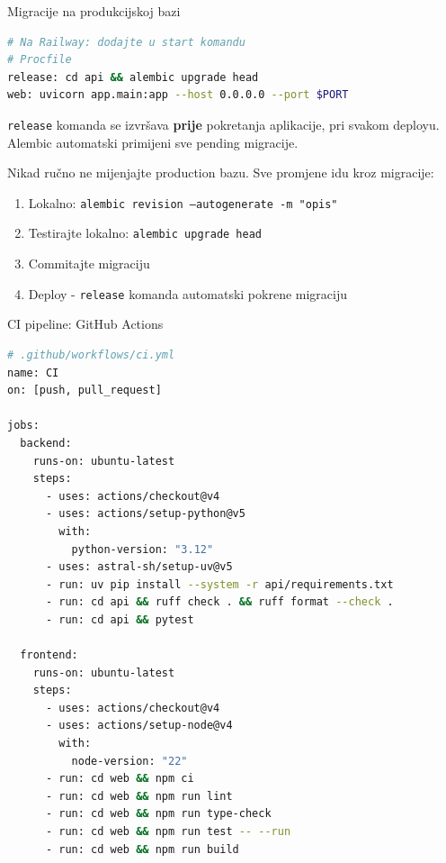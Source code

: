 \begin{frame}[fragile,shrink=5]{Migracije na produkcijskoj bazi}
\begin{lstlisting}[language=bash]
# Na Railway: dodajte u start komandu
# Procfile
release: cd api && alembic upgrade head
web: uvicorn app.main:app --host 0.0.0.0 --port $PORT
\end{lstlisting}

\vspace{0.4em}
\texttt{release} komanda se izvršava \textbf{prije} pokretanja aplikacije, pri svakom deployu. Alembic automatski primijeni sve pending migracije.

\vspace{0.6em}
Nikad ručno ne mijenjajte production bazu. Sve promjene idu kroz migracije:
\begin{enumerate}
  \item Lokalno: \texttt{alembic revision --autogenerate -m "opis"}
  \item Testirajte lokalno: \texttt{alembic upgrade head}
  \item Commitajte migraciju
  \item Deploy - \texttt{release} komanda automatski pokrene migraciju
\end{enumerate}
\end{frame}

\begin{frame}[fragile,shrink=5]{CI pipeline: GitHub Actions}
\begin{lstlisting}[language=bash]
# .github/workflows/ci.yml
name: CI
on: [push, pull_request]

jobs:
  backend:
    runs-on: ubuntu-latest
    steps:
      - uses: actions/checkout@v4
      - uses: actions/setup-python@v5
        with:
          python-version: "3.12"
      - uses: astral-sh/setup-uv@v5
      - run: uv pip install --system -r api/requirements.txt
      - run: cd api && ruff check . && ruff format --check .
      - run: cd api && pytest

  frontend:
    runs-on: ubuntu-latest
    steps:
      - uses: actions/checkout@v4
      - uses: actions/setup-node@v4
        with:
          node-version: "22"
      - run: cd web && npm ci
      - run: cd web && npm run lint
      - run: cd web && npm run type-check
      - run: cd web && npm run test -- --run
      - run: cd web && npm run build
\end{lstlisting}
\end{frame}

